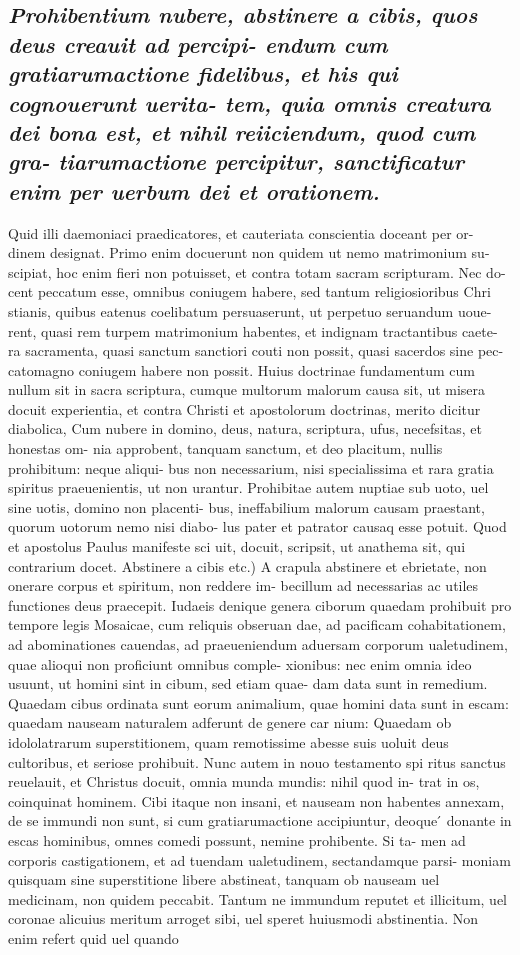 \documentclass{article}
\begin{document}
\begin{pages}
\subsection*{\textit{Prohibentium nubere, abstinere a cibis, quos deus creauit ad percipi- endum cum gratiarumactione fidelibus, et his qui cognouerunt uerita- tem, quia omnis creatura dei bona est, et nihil reiiciendum, quod cum gra- tiarumactione percipitur, sanctificatur enim per uerbum dei et orationem. }}\pstart Quid illi daemoniaci praedicatores, et cauteriata conscientia doceant per or- dinem designat. Primo enim docuerunt non quidem ut nemo matrimonium su- scipiat, hoc enim fieri non potuisset, et contra totam sacram scripturam. Nec do- cent peccatum esse, omnibus coniugem habere, sed tantum religiosioribus Chri stianis, quibus eatenus coelibatum persuaserunt, ut perpetuo seruandum uoue- rent, quasi rem turpem matrimonium habentes, et indignam tractantibus caete- ra sacramenta, quasi sanctum sanctiori couti non possit, quasi sacerdos sine pec- catomagno coniugem habere non possit. Huius doctrinae fundamentum cum nullum sit in sacra scriptura, cumque multorum malorum causa sit, ut misera docuit experientia, et contra Christi et apostolorum doctrinas, merito dicitur diabolica, Cum nubere in domino, deus, natura, scriptura, ufus, necefsitas, et honestas om- nia approbent, tanquam sanctum, et deo placitum, nullis prohibitum: neque aliqui- bus non necessarium, nisi specialissima et rara gratia spiritus praeuenientis, ut non urantur. Prohibitae autem nuptiae sub uoto, uel sine uotis, domino non placenti- bus, ineffabilium malorum causam praestant, quorum uotorum nemo nisi diabo- lus pater et patrator causaq esse potuit. Quod et apostolus Paulus manifeste sci uit, docuit, scripsit, ut anathema sit, qui contrarium docet. Abstinere a cibis etc.) A crapula abstinere et ebrietate, non onerare corpus et spiritum, non reddere im- becillum ad necessarias ac utiles functiones deus praecepit. Iudaeis denique genera ciborum quaedam prohibuit pro tempore legis Mosaicae, cum reliquis obseruan dae, ad pacificam cohabitationem, ad abominationes cauendas, ad praeueniendum aduersam corporum ualetudinem, quae alioqui non proficiunt omnibus comple- xionibus: nec enim omnia ideo usuunt, ut homini sint in cibum, sed etiam quae- dam data sunt in remedium. Quaedam cibus ordinata sunt eorum animalium, quae homini data sunt in escam: quaedam nauseam naturalem adferunt de genere car nium: Quaedam ob idololatrarum superstitionem, quam remotissime abesse suis uoluit deus cultoribus, et seriose prohibuit. Nunc autem in nouo testamento spi ritus sanctus reuelauit, et Christus docuit, omnia munda mundis: nihil quod in- trat in os, coinquinat hominem. Cibi itaque non insani, et nauseam non habentes annexam, de se immundi non sunt, si cum gratiarumactione accipiuntur, deoque ́ donante in escas hominibus, omnes comedi possunt, nemine prohibente. Si ta- men ad corporis castigationem, et ad tuendam ualetudinem, sectandamque parsi- moniam quisquam sine superstitione libere abstineat, tanquam ob nauseam uel medicinam, non quidem peccabit. Tantum ne immundum reputet et illicitum, uel coronae alicuius meritum arroget sibi, uel speret huiusmodi abstinentia. Non enim refert quid uel quando 
\end{pages}
\end{document}
